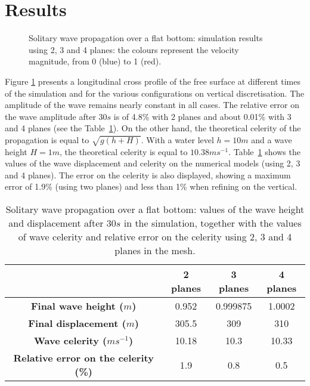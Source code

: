 \section{Results}
%
\begin{figure}[H]
\begin{center}
\caption{Solitary wave propagation over a flat bottom: simulation results using 2, 3 and 4 planes: the
colours represent the velocity magnitude, from 0 (blue) to 1 (red).}
\label{fig:solit_results}
\end{center}
\end{figure}
%
Figure \ref{fig:solit_results} presents a longitudinal cross profile of the free surface
at different times of the simulation and for the various configurations
on vertical discretisation.
The amplitude of the wave remains nearly constant in all cases.
The relative error on the wave amplitude after $30s$ is of 4.8\% with 2 planes and about 0.01\%
with 3 and 4 planes (see the Table~\ref{tab:solit_celerity}).
On the other hand, the theoretical celerity of the propagation is equal to $\sqrt{g(h+H)}$.
With a water level $h = 10m$ and a wave height $H=1m$,
the theoretical celerity is equal to $10.38ms^{-1}$.
Table~\ref{tab:solit_celerity} shows the values of the wave displacement and celerity
on the numerical models (using 2, 3 and 4 planes). The error on the celerity is also
displayed, showing a maximum error of 1.9\% (using two planes) and less than 1\% when refining on the vertical.
\begin{table}[H]
\caption{Solitary wave propagation over a flat bottom:
values of the wave height and displacement after $30s$ in the simulation,
together with the values of wave celerity and relative error on the celerity
using 2, 3 and 4 planes in the mesh.}
\label{tab:solit_celerity}
\begin{center}\begin{tabular}{|c|c|c|c|}
\hline
~ & \textbf{2 planes} & \textbf{3 planes} & \textbf{4 planes}\\
\hline
\textbf{Final wave height ($m$)} & 0.952 & 0.999875 & 1.0002 \\
\hline
\textbf{Final displacement ($m$)} & 305.5 & 309 & 310 \\
\hline
\textbf{Wave celerity ($ms^{-1}$)} & 10.18 & 10.3 & 10.33 \\
\hline
\textbf{Relative error on the celerity (\%)} & 1.9 & 0.8 & 0.5 \\
\hline
\end{tabular}\end{center}
\end{table}
